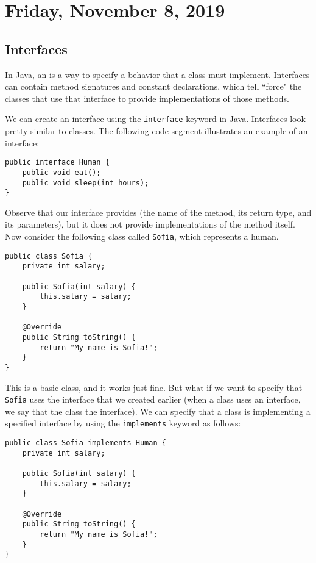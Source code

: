 \section{Friday, November 8, 2019}

\subsection{Interfaces}

In Java, an  is a way to specify a behavior that a class must implement. Interfaces can contain method signatures and constant declarations, which tell ``force" the classes that use that interface to provide implementations of those methods. 

We can create an interface using the \verb!interface! keyword in Java. Interfaces look pretty similar to classes. The following code segment illustrates an example of an interface:


\begin{lstlisting}
public interface Human {
    public void eat();
    public void sleep(int hours);
}
\end{lstlisting}

Observe that our interface provides  (the name of the method, its return type, and its parameters), but it does not provide implementations of the method itself. Now consider the following class called \verb!Sofia!, which represents a human. 

\begin{lstlisting}
public class Sofia {
    private int salary;
    
    public Sofia(int salary) {
        this.salary = salary;
    }
    
    @Override
    public String toString() {
        return "My name is Sofia!";
    }
}
\end{lstlisting}

This is a basic class, and it works just fine. But what if we want to specify that \verb!Sofia! uses the interface that we created earlier (when a class uses an interface, we say that the class  the interface). We can specify that a class is implementing a specified interface by using the \verb!implements! keyword as follows:


\begin{lstlisting}
public class Sofia implements Human {
    private int salary;
    
    public Sofia(int salary) {
        this.salary = salary;
    }
    
    @Override
    public String toString() {
        return "My name is Sofia!";
    }
}
\end{lstlisting}

